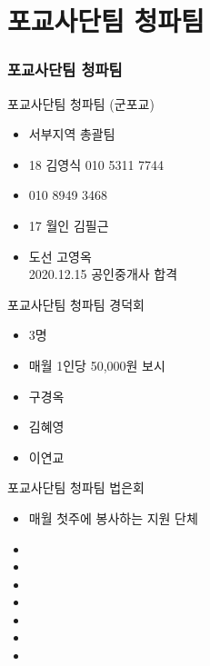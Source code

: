 \documentclass[aspectratio=1610,20pt,xcolor=pdftex,dvipsnames,table,handout]{beamer}
\begin{document}
		\section{포교사단팀 청파팀 }
		\begin{frame} [t,plain]
		\frametitle{포교사단팀 청파팀 }
			\begin{block} {포교사단팀 청파팀 (군포교)}
			\setlength{\leftmargini}{2em}			
			\begin{itemize}
				\item 서부지역 총괄팀 
				\item 18 김영식 010 5311 7744
				\item 010 8949 3468
				\item 17 월인 김필근 
				\item 도선 고영옥 \\2020.12.15 공인중개사 합격
			\end{itemize}
			\end{block}						
		\end{frame}						

		\begin{frame} [t,plain]
			\begin{block} {포교사단팀 청파팀 경덕회 }
			\setlength{\leftmargini}{2em}			
			\begin{itemize}
				\item 3명
				\item 매월 1인당 50,000원 보시
				\item 구경옥
				\item 김혜영
				\item 이연교
			\end{itemize}
			\end{block}						
		\end{frame}						


		\begin{frame} [t,plain]
			\begin{block} {포교사단팀 청파팀 법은회 }
			\setlength{\leftmargini}{2em}			
			\begin{itemize}
				\item 매월 첫주에 봉사하는 지원 단체
				\item 
				\item 
				\item 
				\item 
				\item 
				\item 
				\item 
			\end{itemize}
			\end{block}						
		\end{frame}						
\end{document}
